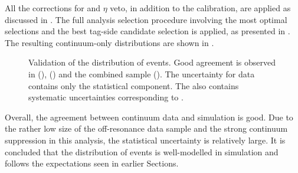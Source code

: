 All the corrections for \piz and $\eta$ veto, in addition to the \FEI calibration, are applied as discussed in .
The full analysis selection procedure involving the most optimal selections and the best tag-side candidate selection is applied, as presented in .
The resulting continuum-only \EB distributions are shown in .
\begin{figure}[htbp!]
    \caption{\label{fig:offresonance_validation} Validation of the \EB distribution of \epem\ra\qqbar events.
    Good agreement is observed in \feiBp (), \feiBz ()
    and the combined sample ().
    The uncertainty for data contains only the statistical component.
    The \MC also contains systematic uncertainties corresponding to .
    }
\end{figure}

Overall, the agreement between continuum data and simulation is good.
Due to the rather low size of the off-resonance data sample and the strong continuum suppression in this analysis, the statistical uncertainty is relatively large.
It is concluded that the \EB distribution of \epem\ra\qqbar events is well-modelled in simulation and follows the expectations seen in earlier Sections.

